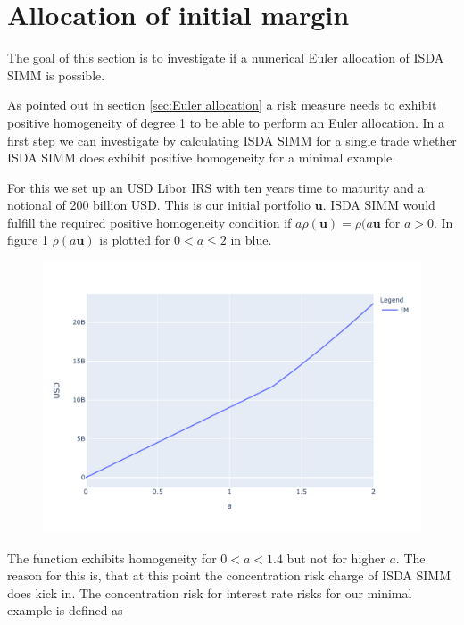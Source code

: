 \documentclass[../Thesis_AHoecherl.tex]{subfiles}
\begin{document}
    \section{Allocation of initial margin}\label{Allocation of initial margin}
    The goal of this section is to investigate if a numerical Euler allocation of \gls{ISDA SIMM} is possible.
    
    As pointed out in section \ref{sec:Euler allocation} a risk measure needs to exhibit positive homogeneity of degree 1 to be able to perform an Euler allocation.
    In a first step we can investigate by calculating ISDA SIMM for a single trade whether ISDA SIMM does exhibit positive homogeneity for a minimal example.

    For this we set up an USD Libor IRS with ten years time to maturity and a notional of 200 billion USD. This is our initial portfolio $\mathbf{u}$. ISDA SIMM would fulfill the required positive homogeneity condition if $a \rho(\mathbf{u}) = \rho(a \mathbf{u}$ for $a>0$. In figure \ref{fig:homogeneity of ISDA SIMM} $\rho(a\mathbf{u})$ is plotted for $0<a\leq 2$ in blue. 
    \begin{figure}
        \centering
        \includegraphics{Graphics/ISDA_SIMM_homogenity.pdf}
        \caption{}
        \label{fig:homogeneity of ISDA SIMM}
    \end{figure}
    The function exhibits homogeneity for $0<a<1.4$  but not for higher $a$. 
    The reason for this is, that at this point the concentration risk charge of ISDA SIMM does kick in.
    The concentration risk for interest rate risks for our minimal example is defined as \cite[Article 7.b]{SIMM}
\end{document}
